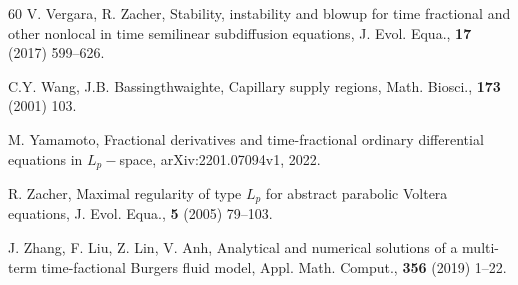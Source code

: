 \documentclass[reqno]{amsart}
\theoremstyle{definition}
\numberwithin{equation}{section}
\begin{document}
\begin{thebibliography}{60}
V. Vergara, R. Zacher, Stability, instability and blowup for time fractional and other nonlocal in time semilinear subdiffusion equations, J. Evol. Equa., \textbf{17} (2017) 599--626.

 C.Y. Wang, J.B. Bassingthwaighte, Capillary supply regions, Math. Biosci., \textbf{173} (2001) 103.

M. Yamamoto, Fractional derivatives and time-fractional ordinary differential equations in $L_{p}-$space, arXiv:2201.07094v1, 2022.

R. Zacher, Maximal regularity of type $L_{p}$ for abstract parabolic Voltera equations, J. Evol. Equa., \textbf{5} (2005) 79--103.

J. Zhang, F. Liu, Z. Lin, V. Anh, Analytical and numerical solutions of a multi-term time-factional Burgers fluid model,
 Appl. Math. Comput.,
\textbf{356} (2019) 1--22.

\end{thebibliography}
\end{document}

